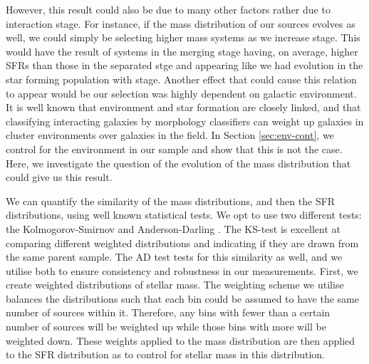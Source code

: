 However, this result could also be due to many other factors rather due to interaction stage. For instance, if the mass distribution of our sources evolves as well, we could simply be selecting higher mass systems as we increase stage. This would have the result of systems in the merging stage having, on average, higher SFRs than those in the separated stge and appearing like we had evolution in the star forming population with stage. Another effect that could cause this relation to appear would be our selection was highly dependent on galactic environment. It is well known that environment and star formation are closely linked, and that classifying interacting galaxies by morphology classifiers can weight up galaxies in cluster environments over galaxies in the field. In Section \ref{sec:env-cont}, we control for the environment in our sample and show that this is not the case. Here, we investigate the question of the evolution of the mass distribution that could give us this result.

We can quantify the similarity of the mass distributions, and then the SFR distributions, using well known statistical tests. We opt to use two different tests: the Kolmogorov-Smirnov \citep[KS-test;][]{an1933sulla} and Anderson-Darling \citep[AD-test;][]{stephens_74}. The KS-test is excellent at comparing different weighted distributions and indicating if they are drawn from the same parent sample. The AD test tests for this similarity as well, and we utilise both to ensure consistency and robustness in our measurements. First, we create weighted distributions of stellar mass. The weighting scheme we utilise balances the distributions such that each bin could be assumed to have the same number of sources within it. Therefore, any bins with fewer than a certain number of sources will be weighted up while those bins with more will be weighted down. These weights applied to the mass distribution are then applied to the SFR distribution as to control for stellar mass in this distribution.

